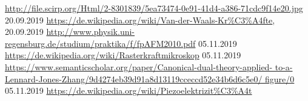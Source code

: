 \begin{thebibliography}{xxx}
        \url{http://file.scirp.org/Html/2-8301839/5ea73474-0e91-41d4-a386-71cdc9f14e20.jpg}
        20.09.2019
        \url{https://de.wikipedia.org/wiki/Van-der-Waals-Kr%C3%A4fte},
		20.09.2019
        \url{http://www.physik.uni-regensburg.de/studium/praktika/f/fpAFM2010.pdf}
        05.11.2019
        \url{https://de.wikipedia.org/wiki/Rasterkraftmikroskop}
        05.11.2019
        \url{https://www.semanticscholar.org/paper/Canonical-dual-theory-applied-
             to-a-Lennard-Jones-Zhang/9d4274eb39d91a8d13119cceccd52e34b6d6c5e0/
             figure/0}
        05.11.2019
        \url{https://de.wikipedia.org/wiki/Piezoelektrizit%C3%A4t}
	
\end{thebibliography}
 
